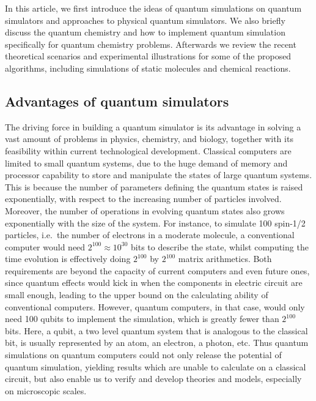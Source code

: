 \documentclass[8.5pt,twoside,twocolumn]{article}
\begin{document}
In this article, we first introduce the ideas of
quantum simulations on quantum simulators
and approaches to physical quantum simulators.
We also briefly discuss the quantum chemistry
and how to implement quantum simulation
specifically for quantum chemistry problems.
Afterwards we review the recent theoretical
scenarios and experimental illustrations
for some of the proposed algorithms,
including simulations of static molecules
and chemical reactions.
\subsection{Advantages of quantum simulators}

The driving force in building a quantum simulator is its
advantage in solving a vast amount of problems in physics,
chemistry, and biology, together with its feasibility
within current technological development.
Classical computers
are limited to small quantum systems,
due to the huge demand of memory
and processor capability
to store and manipulate the states of large quantum systems.
This is because the number of parameters
defining the quantum states
is raised exponentially,
with respect to the increasing number of particles involved.
Moreover, the number of operations in evolving quantum states
also grows exponentially with the size of the system.
For instance, to simulate 100 spin-1/2 particles, i.e.\
the number of electrons in a moderate molecule,
a conventional computer would need $2^{100}\approx10^{30}$ bits
to describe the state,
whilst computing the time evolution is effectively
doing $2^{100}$ by $2^{100}$ matrix arithmetics.
Both requirements are beyond the capacity of current computers
and even future ones, since quantum effects would
kick in when the components in electric circuit are small enough,
leading to the upper bound on the calculating ability of
conventional computers.
However, quantum computers, in that case,
would only need 100 qubits to implement the simulation,
which is greatly fewer than $2^{100}$ bits.
Here, a qubit, a two level quantum system that is analogous
to the classical bit, is usually represented by an atom,
an electron, a photon, etc.
Thus quantum simulations on quantum computers could
not only release the potential of quantum simulation,
yielding results which are unable to calculate
on a classical circuit, but also enable us to
verify and develop theories and models,
especially on microscopic scales.\cite{Quantum_simulator}
\end{document}
